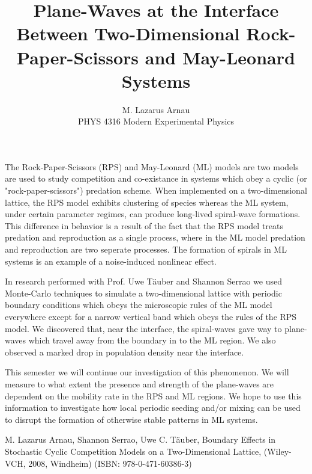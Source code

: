 \documentclass[12pt]{article}
\title{Plane-Waves at the Interface Between Two-Dimensional Rock-Paper-Scissors and May-Leonard Systems}
\author{M. Lazarus Arnau\\ PHYS 4316 Modern Experimental Physics}
\begin{document}
    
\maketitle

The Rock-Paper-Scissors (RPS) and May-Leonard (ML) models are two models are used 
to study competition and co-existance in systems which obey a cyclic (or 
"rock-paper-scissors") predation scheme. When implemented on a two-dimensional 
lattice, the RPS model exhibits clustering of species whereas the ML system, under
certain parameter regimes, can produce long-lived spiral-wave formations. This 
difference in behavior is a result of the fact that the RPS model treats predation 
and reproduction as a single process, where in the ML model predation and 
reproduction are two seperate processes. The formation of spirals in ML systems 
is an example of a noise-induced nonlinear effect. 

In research performed with Prof. Uwe T{\"a}uber and Shannon Serrao we used 
Monte-Carlo techniques to simulate a two-dimensional lattice with periodic 
boundary conditions which obeys the microscopic rules of the ML model everywhere
except for a narrow vertical band which obeys the rules of the RPS model. We 
discovered that, near the interface, the spiral-waves gave way to plane-waves
which travel away from the boundary in to the ML region. We also observed a marked
drop in population density near the interface.

This semester we will continue our investigation of this phenomenon. We will 
measure to what extent the presence and strength of the plane-waves are dependent 
on the mobility rate in the RPS and ML regions. We hope to use this information 
to investigate how local periodic seeding and/or mixing can be used to disrupt 
the formation of otherwise stable patterns in ML systems. 


\begin{thebibliography}{99}

     M. Lazarus Arnau, Shannon Serrao, Uwe C. T{\"a}uber, \emph{}Boundary Effects in Stochastic Cyclic Competition Models on a Two-Dimensional Lattice, (Wiley-VCH, 2008, Windheim) (ISBN: 978-0-471-60386-3)

\end{thebibliography}
\end{document}
